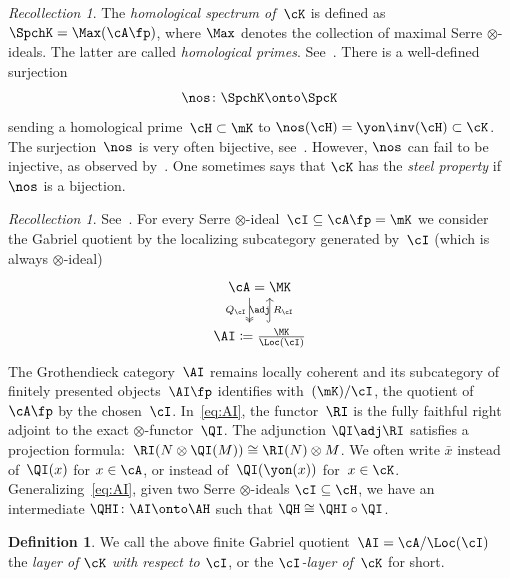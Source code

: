 \documentclass[11pt]{amsart}
\numberwithin{equation}{section} %
\theoremstyle{plain}
\theoremstyle{definition}
\newtheorem{dfn}[equation]{Definition}
\theoremstyle{remark}
\newtheorem{rec}[equation]{Recollection}
\begin{document}
%
\begin{rec}\label{rec:Spch}%
The \emph{homological spectrum of~$\cK$} is defined as $\SpchK=\Max(\cA\fp)$, where $\Max$ denotes the collection of maximal Serre $\otimes$-ideals. 
The latter are called \emph{homological primes}. See~\cite{Balmer20a}.
There is a well-defined surjection
%
\begin{equation*}
    \nos\colon \SpchK \onto \SpcK
\end{equation*}
%
sending a homological prime~$\cH\subset\mK$ to $\nos(\cH)=\yon\inv(\cH)\subset\cK$.
The surjection~$\nos$ is very often bijective, see~\cite[\S\,5]{Balmer20a}. However, $\nos$ can fail to be injective, as observed by~\cite{Hyslopetal26pp,Coulembier26pp}.
One sometimes says that $\cK$ has the \emph{steel property} if~$\nos$ is a bijection.
\end{rec}

%
\begin{rec}
\label{rec:A/I}%
See~\cite[\S\,2]{BalmerKrauseStevenson19}.
For every Serre $\otimes$-ideal~$\cI\subseteq \cA\fp=\mK$ we consider the Gabriel quotient by the localizing subcategory generated by~$\cI$ (which is always $\otimes$-ideal)
%
\begin{equation} 
\label{eq:AI}%
%
\begin{tikzcd} 
	{\cA = \MK} \\
	{\AI\coloneq\frac{\MK}{\Loc(\cI)}}
	\arrow[""{name=0, anchor=center, inner sep=0}, "{Q_\cI}"', shift right=3, two heads, from=1-1, to=2-1]
	\arrow[""{name=1, anchor=center, inner sep=0}, "{R_\cI}"', shift right=3, hook, from=2-1, to=1-1]
	\arrow["\adj"{anchor=center}, draw=none, from=0, to=1]
\end{tikzcd}
\end{equation}
%
The Grothendieck category~$\AI$ remains locally coherent and its subcategory of finitely presented objects~$\AI\fp$ identifies with~$(\mK)/\cI$, the quotient of~$\cA\fp$ by the chosen~$\cI$. In~\eqref{eq:AI}, the functor~$\RI$ is the fully faithful right adjoint to the exact $\otimes$-functor~$\QI$. The adjunction $\QI \adj \RI$ satisfies a projection formula:~$\RI(N \otimes \QI(M)) \cong \RI(N) \otimes M$. 
We often write $\bar{x}$ instead of~$\QI(x)$ for $x\in\cA$, or instead of~$\QI(\yon(x))$ for~$x\in \cK$. Generalizing~\eqref{eq:AI}, given two Serre $\otimes$-ideals $\cI\subseteq\cH$, we have an intermediate $\QHI\colon \AI\onto \AH$ such that $\QH\cong \QHI\circ\QI$.
\end{rec}

%
\begin{dfn}
\label{dfn:layer}%
We call the above finite Gabriel quotient~$\AI=\cA/\Loc(\cI)$ the \emph{layer of $\cK$ with respect to $\cI$}, or the \emph{$\cI$-layer of~$\cK$} for short.
\end{dfn}
\end{document}
